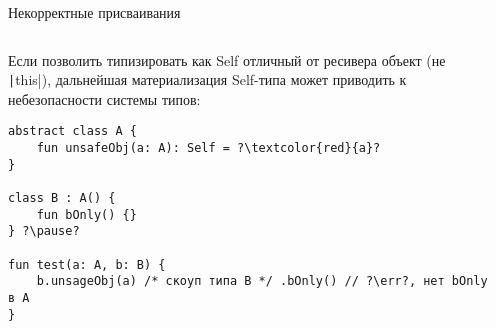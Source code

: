 \documentclass[handout,aspectratio=169,usenames,dvipsnames]{beamer}
\newcommand{\err}[0]{\textcolor{red}{ошибка}}
\begin{document}
    \begin{frame}[fragile]{Некорректные присваивания}
        \begin{columns}[onlytextwidth]
            \begin{column}{0.99\textwidth}
                Если позволить типизировать как Self отличный от ресивера объект (не \texttt|this|), дальнейшая материализация Self-типа может приводить к небезопасности системы типов:
                \pause
                \begin{verbatim}
abstract class A {
    fun unsafeObj(a: A): Self = ?\textcolor{red}{a}?
}

class B : A() {
    fun bOnly() {}
} ?\pause?

fun test(a: A, b: B) {
    b.unsageObj(a) /* скоуп типа B */ .bOnly() // ?\err?, нет bOnly в A
}
                \end{verbatim}
            \end{column}\hfill%
            \begin{column}{0.0\textwidth}
            \end{column}
        \end{columns}
    \end{frame}
\end{document}
